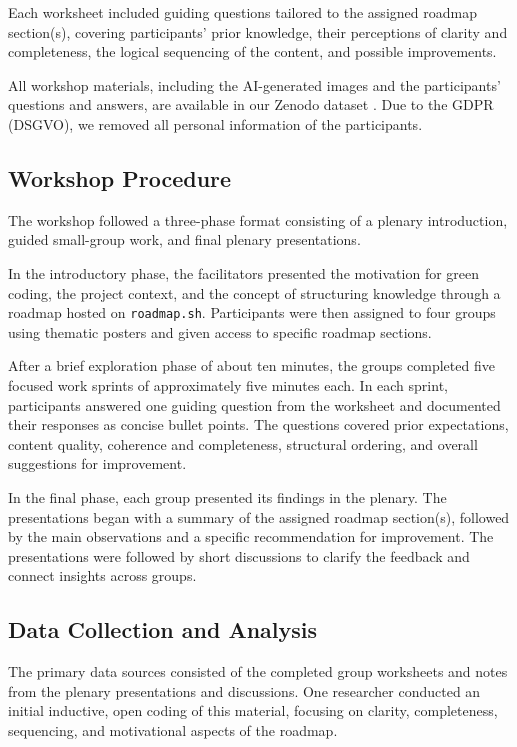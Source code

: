 \documentclass[english]{lni}
\begin{document}
Each worksheet included guiding questions tailored to the assigned roadmap section(s), covering participants’ prior knowledge, their perceptions of clarity and completeness, the logical sequencing of the content, and possible improvements.

All workshop materials, including the AI-generated images and the participants' questions and answers, are available in our Zenodo dataset \cite{junger_2026_workshop}. Due to the GDPR (DSGVO), we removed all personal information of the participants.

\subsection{Workshop Procedure}
The workshop followed a three-phase format consisting of a plenary introduction, guided small-group work, and final plenary presentations.

In the introductory phase, the facilitators presented the motivation for green coding, the project context, and the concept of structuring knowledge through a roadmap hosted on \texttt{roadmap.sh}. Participants were then assigned to four groups using thematic posters and given access to specific roadmap sections.

After a brief exploration phase of about ten minutes, the groups completed five focused work sprints of approximately five minutes each. In each sprint, participants answered one guiding question from the worksheet and documented their responses as concise bullet points. The questions covered prior expectations, content quality, coherence and completeness, structural ordering, and overall suggestions for improvement.

In the final phase, each group presented its findings in the plenary. The presentations began with a summary of the assigned roadmap section(s), followed by the main observations and a specific recommendation for improvement. The presentations were followed by short discussions to clarify the feedback and connect insights across groups.

\subsection{Data Collection and Analysis}
The primary data sources consisted of the completed group worksheets and notes from the plenary presentations and discussions. One researcher conducted an initial inductive, open coding of this material, focusing on clarity, completeness, sequencing, and motivational aspects of the roadmap.
\end{document}
